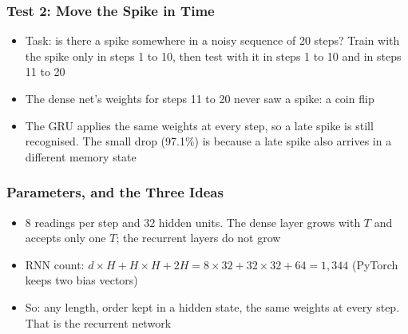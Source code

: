 \begin{frame}[fragile] \frametitle{Test 2: Move the Spike in Time}
\begin{itemize}
\item Task: is there a spike somewhere in a noisy sequence of 20 steps? Train with the spike only in steps 1 to 10, then test with it in steps 1 to 10 and in steps 11 to 20
\end{itemize}
\begin{center}
\small
{}
\end{center}
\begin{itemize}
\item The dense net's weights for steps 11 to 20 never saw a spike: a coin flip
\item The GRU applies the same weights at every step, so a late spike is still recognised. The small drop (97.1\%) is because a late spike also arrives in a different memory state
\end{itemize}
\end{frame}

\begin{frame}[fragile] \frametitle{Parameters, and the Three Ideas}
\begin{center}
\small
{}
\end{center}
\begin{itemize}
\item $8$ readings per step and $32$ hidden units. The dense layer grows with $T$ and accepts only one $T$; the recurrent layers do not grow
\item RNN count: $d \times H + H \times H + 2H = 8 \times 32 + 32 \times 32 + 64 = 1{,}344$ (PyTorch keeps two bias vectors)
\item So: any length, order kept in a hidden state, the same weights at every step. That is the recurrent network
\end{itemize}
\end{frame}
